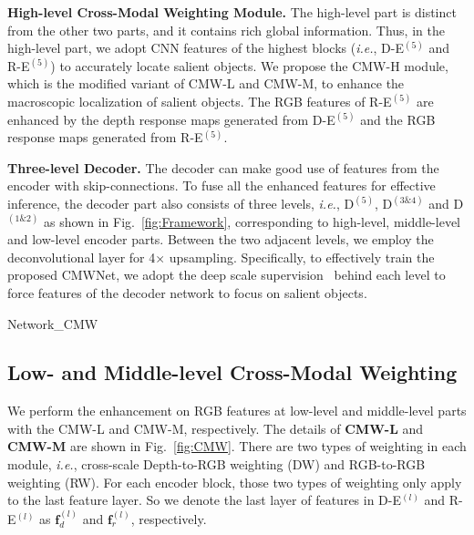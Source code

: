 \documentclass[runningheads]{llncs}
\newcommand{\ie}{\emph{i.e.}}
\begin{document}
\noindent\textbf{High-level Cross-Modal Weighting Module.}
The high-level part is distinct from the other two parts,
and it contains rich global information.
Thus, in the high-level part, we adopt CNN features of the highest blocks
(\ie, D-E$^{(5)}$ and R-E$^{(5)}$)
to accurately locate salient objects.
We propose the CMW-H module, which is the modified variant of CMW-L and CMW-M,
to enhance the macroscopic localization of salient objects.
The RGB features of R-E$^{(5)}$ are enhanced by the depth response maps generated from
D-E$^{(5)}$ and the RGB response maps generated from R-E$^{(5)}$.



\noindent\textbf{Three-level Decoder.}
The decoder can make good use of features from the encoder
with skip-connections.
To fuse all the enhanced features for effective inference,
the decoder part also consists of three levels,
\ie, D$^{(5)}$, D$^{(3\&4)}$ and D$^{(1\&2)}$ as shown in Fig.~\ref{fig:Framework},
corresponding to high-level, middle-level and low-level encoder parts.
Between the two adjacent levels, we employ the deconvolutional layer
for 4$\times$ upsampling.
Specifically, to effectively train the proposed CMWNet, we adopt the deep scale
supervision~\cite{2015DeepSup} behind each level to force features of the decoder
network to focus on salient objects.



\begin{figure*}[t!]
	\centering
	\begin{overpic}[width=\textwidth]{Network_CMW}
    \end{overpic}
\caption{\small \textbf{Details of the three proposed RGB-depth interaction modules: CMW-L, CMW-M and CMW-H.}	
    All modules consist of Depth-to-RGB Weighting (DW) and RGB-to-RGB Weighting (RW) as key operations.
	Notably, the DW in CMW-L and CMW-M is performed in the cross-scale manner between two adjacent blocks, which effectively captures the feature continuity and activates cross-modal cross-scale interactions.
    }
\label{fig:CMW}
\end{figure*}




\subsection{Low- and Middle-level Cross-Modal Weighting}
\label{sec:CCW}

We perform the enhancement on RGB features at low-level and
middle-level parts with the CMW-L and CMW-M, respectively.
The details of \textbf{CMW-L} and \textbf{CMW-M} are shown
in Fig.~\ref{fig:CMW}.
There are two types of weighting in each module, \ie,
cross-scale Depth-to-RGB weighting (DW) and RGB-to-RGB weighting (RW).
For each encoder block, those two types of weighting
only apply to the last feature layer.
So we denote the last layer of features in D-E$^{(l)}$ and R-E$^{(l)}$
as $\mathbf{f}^{(l)}_{d}$ and $\mathbf{f}^{(l)}_{r}$, respectively.
\end{document}
